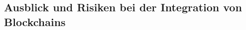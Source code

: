 \subsection{Ausblick und Risiken bei der Integration von Blockchains}
\cite[p.~17]{pirafelnerblockchaintechnologie}





